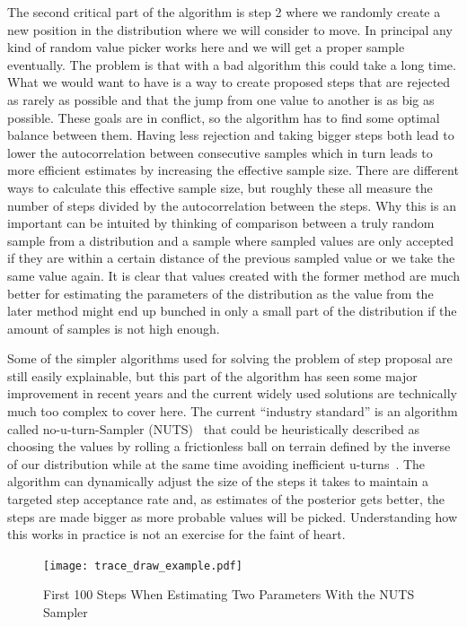 \documentclass[12pt,a4paper,leqno]{report}
\theoremstyle{plain}
\theoremstyle{definition}
\theoremstyle{remark}
\begin{document}
The second critical part of the algorithm is step 2 where we randomly create a new
position in the distribution where we will consider to move. In principal any kind of
random value picker works here and we will get a proper sample eventually. The problem is
that with a bad algorithm this could take a long time. What we would want to have is a
way to create proposed steps that are rejected as rarely as possible and that the
jump from one value to another is as big as possible. These goals are in
conflict, so the algorithm has to find some optimal balance between them.
Having less rejection and taking bigger steps both lead to lower the autocorrelation
between consecutive samples which in turn leads to more efficient estimates by increasing the
effective sample size. There are different ways to calculate this effective sample size, but roughly
these all measure the number of steps divided by the autocorrelation between the steps.
Why this is an important can be intuited by thinking of comparison between a truly
random sample from a distribution and a sample where sampled values are only accepted if they are within a certain distance of the
previous sampled value or we take the same value again. It is clear that values created
with the former method are much better for
estimating the parameters of the distribution as the value from the later method might
end up bunched in only a small part of the distribution if the amount of samples is not
high enough.

Some of the simpler algorithms used for solving the problem of step proposal are still easily explainable, but
this part of the algorithm has seen some major improvement in recent years and the
current widely used solutions are technically much too complex to cover here. The
current ``industry standard'' is an algorithm called no-u-turn-Sampler (NUTS)\ \cite{nuts}
that could be heuristically described as choosing the values by rolling a frictionless
ball on terrain defined by the inverse of our distribution while at the same time
avoiding inefficient u-turns\ \cite{kruschke}. The algorithm can dynamically adjust the
size of the steps it takes to maintain a targeted step acceptance rate and, as estimates of
the posterior gets better, the steps are made bigger as more probable values will be
picked. Understanding how this works in practice is not an exercise for the faint of heart.

\begin{figure}[H]
    \centering
    \caption{First 100 Steps When Estimating Two Parameters With the NUTS Sampler}\label{traceexample}
    \texttt{[image: trace\_draw\_example.pdf]}
\end{figure}
\end{document}
